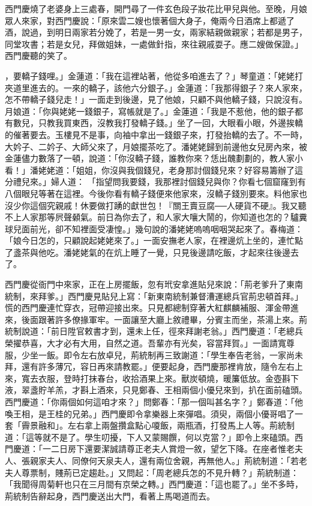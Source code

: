 西門慶燒了老婆身上三處春，開門尋了一件玄色段子妝花比甲兒與他。至晚，月娘眾人來家，對西門慶說：「原來雲二嫂也懷著個大身子，俺兩今日酒席上都遞了酒，說過，到明日兩家若分娩了，若是一男一女，兩家結親做親家；若都是男子，同堂攻書；若是女兒，拜做姐妹，一處做針指，來往親戚耍子。應二嫂做保證。」 西門慶聽的笑了。

，要轎子錢哩。」金蓮道：「我在這裡站著，他從多咱進去了？」琴童道：「姥姥打夾道里進去的。一來的轎子，該他六分銀子。」金蓮道：「我那得銀子？來人家來，怎不帶轎子錢兒走！」一面走到後邊，見了他娘，只顧不與他轎子錢，只說沒有。月娘道：「你與姥姥一錢銀子，寫帳就是了。」金蓮道：「我是不惹他，他的銀子都有數兒，只教我買東西，沒教我打發轎子錢。」坐了一回，大眼看小眼，外邊挨轎的催著要去。玉樓見不是事，向袖中拿出一錢銀子來，打發抬轎的去了。不一時，大妗子、二妗子、大師父來了，月娘擺茶吃了。潘姥姥歸到前邊他女兒房內來，被金蓮儘力數落了一頓，說道：「你沒轎子錢，誰教你來？恁出醜劃劃的，教人家小看！」潘姥姥道：「姐姐，你沒與我個錢兒，老身那討個錢兒來？好容易籌辦了這分禮兒來。」婦人道： 「指望問我要錢，我那裡討個錢兒與你？你看七個窟窿到有八個眼兒等著在這裡。今後你看有轎子錢便來他家來，沒轎子錢別要來。料他家也沒少你這個究親戚！休要做打踴的獻世包！『關王賣豆腐──人硬貨不硬』。我又聽不上人家那等屄聲顙氣。前日為你去了，和人家大嚷大鬧的，你知道也怎的？驢糞球兒面前光，卻不知裡面受凄惶。」幾句說的潘姥姥嗚嗚咽咽哭起來了。春梅道：「娘今日怎的，只顧說起姥姥來了。」一面安撫老人家，在裡邊炕上坐的，連忙點了盞茶與他吃。潘姥姥氣的在炕上睡了一覺，只見後邊請吃飯，才起來往後邊去了。

西門慶從衙門中來家，正在上房擺飯，忽有玳安拿進貼兒來說：「荊老爹升了東南統制，來拜爹。」西門慶見貼兒上寫：「新東南統制兼督漕運總兵官荊忠頓首拜。」慌的西門慶連忙穿衣，冠帶迎接出來。只見都總制穿著大紅麒麟補服、渾金帶進來，後面跟著許多僚掾軍牢。一面讓至大廳上敘禮畢，分賓主而坐，茶湯上來。荊統制說道：「前日陞官敕書才到，還未上任，徑來拜謝老翁。」西門慶道：「老總兵榮擢恭喜，大才必有大用，自然之道。吾輩亦有光矣，容當拜賀。」一面請寬尊服，少坐一飯。即令左右放卓兒，荊統制再三致謝道：「學生奉告老翁，一家尚未拜，還有許多薄冗，容日再來請教罷。」便要起身，西門慶那裡肯放，隨令左右上來，寬去衣服，登時打抹春台，收拾酒果上來。獸炭頓燒，暖簾低放。金壺斟下液，翠盞貯羊羔，才斟上酒來，只見鄭春、王相兩個小優兒來到，扒在面前磕頭。西門慶道：「你兩個如何這咱才來？」問鄭春：「那一個叫甚名字？」鄭春道：「他喚王相，是王桂的兄弟。」西門慶即令拿樂器上來彈唱。須臾，兩個小優哥唱了一套「霽景融和」。左右拿上兩盤攢盒點心嗄飯，兩瓶酒，打發馬上人等。荊統制道：「這等就不是了。學生叨擾，下人又蒙賜饌，何以克當？」即令上來磕頭。西門慶道：「一二日房下還要潔誠請尊正老夫人賞燈一敘，望乞下降。在座者惟老夫人、張親家夫人、同僚何天泉夫人，還有兩位舍親，再無他人。」荊統制道：「若老夫人尊票制，賤荊已定趨赴。」又問起：「周老總兵怎的不見升轉？」荊統制道：「我聞得周菊軒也只在三月間有京榮之轉。」西門慶道：「這也罷了。」坐不多時，荊統制告辭起身，西門慶送出大門，看著上馬喝道而去。

